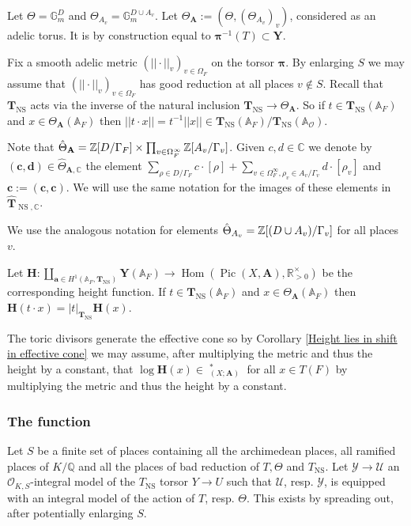 \documentclass[a4paper,11pt,reqno]{amsart}
\newcommand{\Q}{\mathbb{Q}}
\newcommand{\R}{\mathbb{R}}
\newcommand{\C}{\mathbb{C}}
\newcommand{\G}{\mathbb{G}}
\newcommand{\A}{\mathbb{A}}
\DeclareMathOperator{\Hom}{Hom}
\DeclareMathOperator{\Pic}{Pic}
\DeclareMathOperator{\NS}{NS}
\DeclareMathOperator{\Eff}{\overline{Eff}}
\theoremstyle{definition}
\begin{document}
Let $\Theta = \G_m^D$ and $\Theta_{A_v} = \G_m^{D \cup A_v}$. Let $\Theta_{\mathbf{A}} := (\Theta, (\Theta_{A_v})_v)$, considered as an adelic torus. It is by construction equal to $\bm{\pi}^{-1}(T) \subset \mathbf{Y}$.

Fix a smooth adelic metric $(||\cdot||_v)_{v \in \Omega_F}$ on the torsor $\bm{\pi}$. By enlarging $S$ we may assume that $(||\cdot||_v)_{v \in \Omega_F}$ has good reduction at all places $v \not \in S$.
Recall that $\mathbf{T}_{\NS}$ acts via the inverse of the natural inclusion $\mathbf{T}_{\NS} \to \Theta_{\mathbf{A}}$. So if $t \in \mathbf{T}_{\NS}(\A_F)$ and $x \in \Theta_{\mathbf{A}}(\A_F)$ then $||t \cdot x|| = t^{-1} ||x|| \in \mathbf{T}_{\NS}(\A_F)/\mathbf{T}_{\NS}(\A_{\mathcal{O}})$. 

Note that $\hat{\Theta}_{\mathbf{A}} = \mathbb{Z}[D / \Gamma_F] \times \prod_{v \in \Omega_F^{\infty}} \mathbb{Z}[A_v / \Gamma_v]$. Given $c,d \in \C$ we denote by $(\mathbf{c}, \mathbf{d}) \in \hat{\Theta}_{\mathbf{A}, \C}$ the element $\sum_{\rho \in D / \Gamma_F} c \cdot [\rho] + \sum_{v \in \Omega_F^{\infty}, \rho_v \in A_v/ \Gamma_v} d \cdot [\rho_v]$ and $\mathbf{c} := (\mathbf{c}, \mathbf{c})$. We will use the same notation for the images of these elements in $\hat{\mathbf{T}}_{\NS, \C}$.

We use the analogous notation for elements $\hat{\Theta}_{A_v} =\mathbb{Z}[(D \cup A_v) / \Gamma_v]$ for all places $v$. 

Let $\mathbf{H}: \coprod_{\mathbf{a} \in H^1(\A_F, \mathbf{T}_{\NS})} \mathbf{Y}(\A_F) \to \Hom(\Pic (X, \mathbf{A}), \R_{>0}^{\times})$ be the corresponding height function. If $t \in \mathbf{T}_{\NS}(\A_F)$ and $x \in \Theta_{\mathbf{A}}(\A_F)$ then $\mathbf{H}(t \cdot x) = |t|_{\mathbf{T}_{\NS}} \mathbf{H}(x)$.

The toric divisors generate the effective cone so by Corollary \ref{Height lies in shift in effective cone} we may assume, after multiplying the metric and thus the height by a constant, that $\log \mathbf{H}(x) \in \Eff_{(X; \mathbf{A})}^*$ for all $x \in T(F)$ by multiplying the metric and thus the height by a constant.
\subsubsection{The function}\label{sec:The function}
Let $S$ be a finite set of places containing all the archimedean places, all ramified places of $K/\Q$ and all the places of bad reduction of $T, \Theta$ and $T_{\NS}$. Let $\mathcal{Y} \to \mathcal{U}$ an $\mathcal{O}_{K, S}$-integral model of the $T_{\NS}$ torsor $Y \to U$ such that $\mathcal{U}$, resp. $\mathcal{Y}$, is equipped with an integral model of the action of $T$, resp. $\Theta$. This exists by spreading out, after potentially enlarging $S$.
\end{document}
